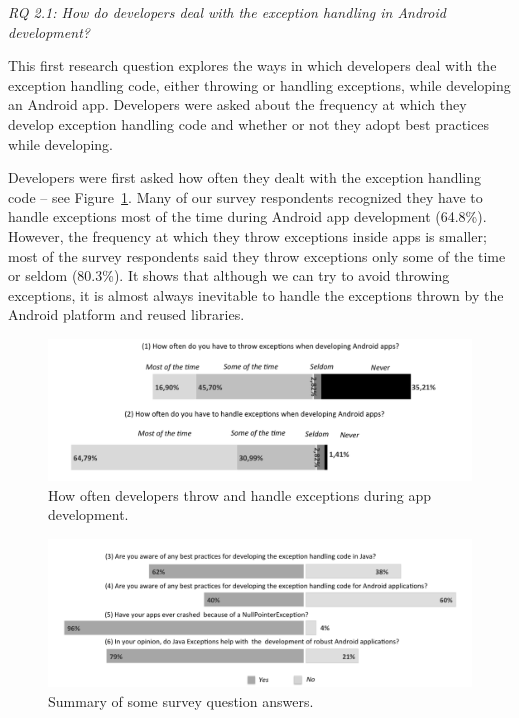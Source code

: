 \bigskip
\noindent\emph{RQ 2.1: How do developers deal with the exception handling in Android development?}
\bigskip

This first research question explores the ways in which developers deal with the exception handling code, either throwing or handling exceptions,  while developing an Android app.  Developers were asked about the frequency at which they develop exception handling code and whether or not they adopt best practices while developing.


Developers were first asked how often they dealt with the exception handling code -- see Figure~\ref{fig:often}. Many of our survey respondents recognized they have to handle exceptions most of the time during Android app development (64.8\%). However, the frequency at which they throw exceptions inside apps is smaller; most of the survey respondents said they throw exceptions only some of the time or seldom (80.3\%). It shows that although we can try to avoid throwing exceptions, it is almost always inevitable to handle the exceptions thrown by the Android platform and reused libraries. 

\begin{figure} \centering \includegraphics[scale=0.58]{agree_new2.png}
\caption{How often developers throw and handle exceptions during app development.}
\label{fig:often}
\end{figure}


\begin{figure} \centering \includegraphics[scale=0.60]{yes_no_new2.png}
\caption{Summary of some survey question answers. }
\label{fig:allquest}
\end{figure}

